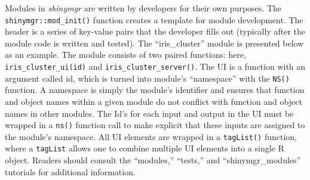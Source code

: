 Modules in \emph{shinymgr} are written by developers for their own purposes. The \texttt{shinymgr::mod\_init()} function creates a template for module development. The header is a series of key-value pairs that the developer fills out (typically after the module code is written and tested). The ``iris\_cluster'' module is presented below as an example. The module consists of two paired functions: here, \texttt{iris\_cluster\_ui(id)} and \texttt{iris\_cluster\_server()}. The UI is a function with an argument called id, which is turned into module's ``namespace'' with the \texttt{NS()} function. A namespace is simply the module's identifier and ensures that function and object names within a given module do not conflict with function and object names in other modules. The Id's for each input and output in the UI must be wrapped in a \texttt{ns()} function call to make explicit that these inputs are assigned to the module's namespace. All UI elements are wrapped in a \texttt{tagList()} function, where a \texttt{tagList} allows one to combine multiple UI elements into a single R object. Readers should consult the ``modules,'' ``tests,'' and ``shinymgr\_modules'' tutorials for additional information.

